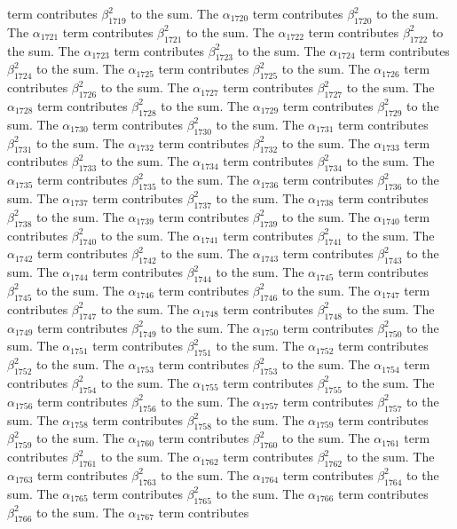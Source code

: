 \begin{lemma}
term contributes $\beta_{1719}^{2}$ to the sum. The $\alpha_{1720}$ term contributes $\beta_{1720}^{2}$ to the sum. The $\alpha_{1721}$ term contributes $\beta_{1721}^{2}$ to the sum. The $\alpha_{1722}$ term contributes $\beta_{1722}^{2}$ to the sum. The $\alpha_{1723}$ term contributes $\beta_{1723}^{2}$ to the sum. The $\alpha_{1724}$ term contributes $\beta_{1724}^{2}$ to the sum. The $\alpha_{1725}$ term contributes $\beta_{1725}^{2}$ to the sum. The $\alpha_{1726}$ term contributes $\beta_{1726}^{2}$ to the sum. The $\alpha_{1727}$ term contributes $\beta_{1727}^{2}$ to the sum. The $\alpha_{1728}$ term contributes $\beta_{1728}^{2}$ to the sum. The $\alpha_{1729}$ term contributes $\beta_{1729}^{2}$ to the sum. The $\alpha_{1730}$ term contributes $\beta_{1730}^{2}$ to the sum. The $\alpha_{1731}$ term contributes $\beta_{1731}^{2}$ to the sum. The $\alpha_{1732}$ term contributes $\beta_{1732}^{2}$ to the sum. The $\alpha_{1733}$ term contributes $\beta_{1733}^{2}$ to the sum. The $\alpha_{1734}$ term contributes $\beta_{1734}^{2}$ to the sum. The $\alpha_{1735}$ term contributes $\beta_{1735}^{2}$ to the sum. The $\alpha_{1736}$ term contributes $\beta_{1736}^{2}$ to the sum. The $\alpha_{1737}$ term contributes $\beta_{1737}^{2}$ to the sum. The $\alpha_{1738}$ term contributes $\beta_{1738}^{2}$ to the sum. The $\alpha_{1739}$ term contributes $\beta_{1739}^{2}$ to the sum. The $\alpha_{1740}$ term contributes $\beta_{1740}^{2}$ to the sum. The $\alpha_{1741}$ term contributes $\beta_{1741}^{2}$ to the sum. The $\alpha_{1742}$ term contributes $\beta_{1742}^{2}$ to the sum. The $\alpha_{1743}$ term contributes $\beta_{1743}^{2}$ to the sum. The $\alpha_{1744}$ term contributes $\beta_{1744}^{2}$ to the sum. The $\alpha_{1745}$ term contributes $\beta_{1745}^{2}$ to the sum. The $\alpha_{1746}$ term contributes $\beta_{1746}^{2}$ to the sum. The $\alpha_{1747}$ term contributes $\beta_{1747}^{2}$ to the sum. The $\alpha_{1748}$ term contributes $\beta_{1748}^{2}$ to the sum. The $\alpha_{1749}$ term contributes $\beta_{1749}^{2}$ to the sum. The $\alpha_{1750}$ term contributes $\beta_{1750}^{2}$ to the sum. The $\alpha_{1751}$ term contributes $\beta_{1751}^{2}$ to the sum. The $\alpha_{1752}$ term contributes $\beta_{1752}^{2}$ to the sum. The $\alpha_{1753}$ term contributes $\beta_{1753}^{2}$ to the sum. The $\alpha_{1754}$ term contributes $\beta_{1754}^{2}$ to the sum. The $\alpha_{1755}$ term contributes $\beta_{1755}^{2}$ to the sum. The $\alpha_{1756}$ term contributes $\beta_{1756}^{2}$ to the sum. The $\alpha_{1757}$ term contributes $\beta_{1757}^{2}$ to the sum. The $\alpha_{1758}$ term contributes $\beta_{1758}^{2}$ to the sum. The $\alpha_{1759}$ term contributes $\beta_{1759}^{2}$ to the sum. The $\alpha_{1760}$ term contributes $\beta_{1760}^{2}$ to the sum. The $\alpha_{1761}$ term contributes $\beta_{1761}^{2}$ to the sum. The $\alpha_{1762}$ term contributes $\beta_{1762}^{2}$ to the sum. The $\alpha_{1763}$ term contributes $\beta_{1763}^{2}$ to the sum. The $\alpha_{1764}$ term contributes $\beta_{1764}^{2}$ to the sum. The $\alpha_{1765}$ term contributes $\beta_{1765}^{2}$ to the sum. The $\alpha_{1766}$ term contributes $\beta_{1766}^{2}$ to the sum. The $\alpha_{1767}$ term contributes 
\end{lemma}

